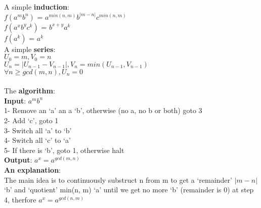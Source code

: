 \documentclass{article}
\begin{document}
\noindent A simple \textbf{induction}:\\
$f(a^mb^n)$ = $a^{min(n, m)}b^{|m - n|}c^{min(n, m)}$\\
$f(a^xb^yc^k)$ = $b^{x+y}a^k$\\
$f(a^k)$ = $a^k$\\
A simple \textbf{series}:\\
$U_0  = m, V_0 = n$\\
$U_n = |U_{n-1} - V_{n-1}|, V_n = min(U_{n-1}, V_{n-1})$\\
$ \forall n \geq gcd(m, n), U_n = 0$\\\\
The \textbf{algorithm}:\\
\textbf{Input}: $a^mb^n$\\
1- Remove an `a' an a `b', otherwise (no a, no b or both) goto 3\\
2- Add `c', goto 1\\
3- Switch all `a' to `b'\\
4- Switch all `c' to `a'\\
5- If there is `b', goto 1, otherwise halt\\
\textbf{Output}: $a^x = a^{gcd(m, n)}$\\

\textbf{An explanation}:\\
The main idea is to continuously substruct n from m to get
a `remainder' $|m - n|$ `b' and  `quotient'  min(n, m)  `a'
until we get no more `b' (remainder is 0) at step 4, therfore
$a^x = a^{gcd(n, m)}$\\
\end{document}
